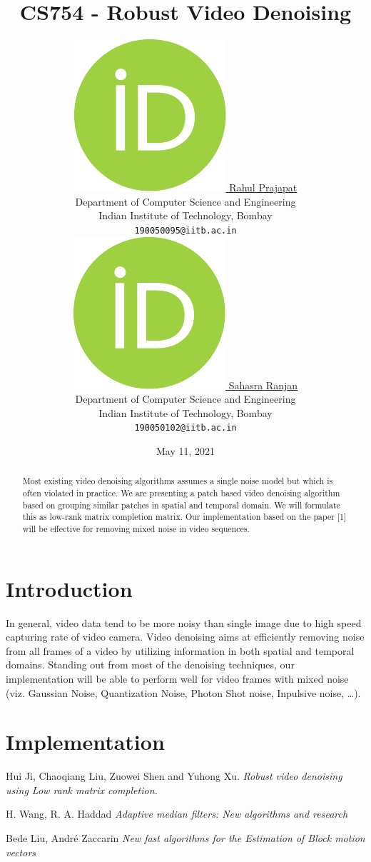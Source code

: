 \documentclass{article}
\title{CS754 - Robust Video Denoising}
\date{May 11, 2021}	%
\author{ \href{https://orcid.org/0000-0000-0000-0000}{\includegraphics[scale=0.06]{orcid.pdf}
    \hspace{1mm}Rahul Prajapat}\\
	Department of Computer Science and Engineering\\
	Indian Institute of Technology, Bombay\\
	\texttt{190050095@iitb.ac.in} \\
	\And
	\href{https://orcid.org/0000-0000-0000-0000}{\includegraphics[scale=0.06]{orcid.pdf}
	\hspace{1mm}Sahasra Ranjan} \\
	Department of Computer Science and Engineering\\
	Indian Institute of Technology, Bombay\\
	\texttt{190050102@iitb.ac.in} \\

}
\begin{document}
\maketitle

\begin{abstract}
	Most existing video denoising algorithms assumes a single noise model but which is often violated in practice. We are presenting a patch based video denoising algorithm based on grouping similar patches in spatial and temporal domain. We will formulate this as low-rank matrix completion matrix. Our implementation based on the paper [1] will be effective for removing mixed noise in video sequences.
\end{abstract}




\section{Introduction}
In general, video data tend to be more noisy than single image due to high speed capturing rate of video camera. Video denoising aims at efficiently removing noise from all frames of a video by utilizing information in both spatial and temporal domains. Standing out from most of the denoising techniques, our implementation will be able to perform well for video frames with mixed noise (viz. Gaussian Noise, Quantization Noise, Photon Shot noise, Inpulsive noise, \dots).


\section{Implementation}








\begin{thebibliography}{9}
Hui Ji, Chaoqiang Liu, Zuowei Shen and Yuhong Xu.
\textit{Robust video denoising using Low rank matrix completion.}

H. Wang, R. A. Haddad
\textit{Adaptive median filters: New algorithms and research}

Bede Liu, Andr\'e Zaccarin
\textit{New fast algorithms for the Estimation of Block motion vectors}


\end{thebibliography}
\end{document}
